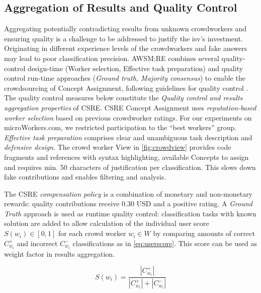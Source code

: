 \vspace{-15pt}
\subsection{Aggregation of Results and Quality Control}
\vspace{10pt}

Aggregating potentially contradicting results from unknown crowdworkers and ensuring quality is a challenge to be addressed to justify the \gls{isv}'s investment.
Originating in different experience levels of the crowdworkers and fake answers may lead to poor classification precision.
AWSM:RE combines several quality-control design-time (Worker selection, Effective task preparation) and quality control run-time approaches (\emph{Ground truth, Majority consensus}) \autocite{Heil2018CSRE,Heil2019CSRECCIS} to enable the crowdsourcing of \gls{Concept Assignment}, following guidelines for quality control \autocite{Daniel2018CrowdsourcingQuality,Allahbakhsh2013}.
The quality control measures below constitute the \emph{Quality control and results aggregation properties} of CSRE.
CSRE \gls{Concept Assignment} uses \emph{reputation-based worker selection} based on previous crowdworker ratings.
For our experiments on microWorkers.com, we restricted participation to the ``best workers'' group.
\emph{Effective task preparation} comprises clear and unambiguous task description and \emph{defensive design}.
The crowd worker View in \cref{fig:crowdview} provides code fragments and references with syntax highlighting, available \glspl{Concept} to assign and requires min. 50 characters of justification per classification.
This slows down fake contributions and enables filtering and analysis.

The CSRE \emph{compensation policy} is a combination of monetary and non-monetary rewards: quality contributions receive 0.30 USD and a positive rating.
A \emph{Ground Truth} approach is used as runtime quality control: classification tasks with known solution are added to allow calculation of the individual user score \(S(w_i) \in [0,1]\) for each crowd worker \(w_i\in W\) by comparing amounts of correct \(C^+_{w_i}\) and incorrect \(C^-_{w_i}\) classifications as in \cref{eq:userscore}.
This score can be used as weight factor in results aggregation.

\begin{equation}S(w_i) = \frac{|C^+_{w_i}|}{|C^+_{w_i}| + |C^-_{w_i}|}\label{eq:userscore}\end{equation}

